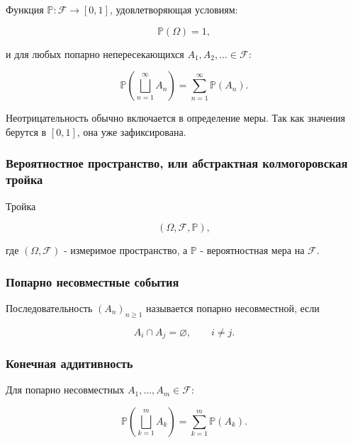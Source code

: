 \documentclass[
  11pt,
  a4paper,
]{article}
\begin{document}
Функция \(\mathbb P:\mathcal F\to[0,1]\), удовлетворяющая условиям:

\[
\mathbb P(\Omega)=1,
\]

и для любых попарно непересекающихся \(A_1,A_2,\ldots\in\mathcal F\):

\[
\mathbb P\left(\bigsqcup_{n=1}^{\infty}A_n\right)
=
\sum_{n=1}^{\infty}\mathbb P(A_n).
\]

Неотрицательность обычно включается в определение меры. Так как значения
берутся в \([0,1]\), она уже зафиксирована.

\subsubsection{Вероятностное пространство, или абстрактная
колмогоровская
тройка}\label{ux432ux435ux440ux43eux44fux442ux43dux43eux441ux442ux43dux43eux435-ux43fux440ux43eux441ux442ux440ux430ux43dux441ux442ux432ux43e-ux438ux43bux438-ux430ux431ux441ux442ux440ux430ux43aux442ux43dux430ux44f-ux43aux43eux43bux43cux43eux433ux43eux440ux43eux432ux441ux43aux430ux44f-ux442ux440ux43eux439ux43aux430}

Тройка

\[
(\Omega,\mathcal F,\mathbb P),
\]

где \((\Omega,\mathcal F)\) - измеримое пространство, а \(\mathbb P\) -
вероятностная мера на \(\mathcal F\).

\subsubsection{Попарно несовместные
события}\label{ux43fux43eux43fux430ux440ux43dux43e-ux43dux435ux441ux43eux432ux43cux435ux441ux442ux43dux44bux435-ux441ux43eux431ux44bux442ux438ux44f}

Последовательность \((A_n)_{n\ge1}\) называется попарно несовместной,
если

\[
A_i\cap A_j=\varnothing,\qquad i\ne j.
\]

\subsubsection{Конечная
аддитивность}\label{ux43aux43eux43dux435ux447ux43dux430ux44f-ux430ux434ux434ux438ux442ux438ux432ux43dux43eux441ux442ux44c}

Для попарно несовместных \(A_1,\ldots,A_m\in\mathcal F\):

\[
\mathbb P\left(\bigsqcup_{k=1}^{m}A_k\right)
=
\sum_{k=1}^{m}\mathbb P(A_k).
\]
\end{document}
